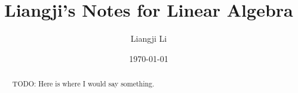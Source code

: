 \documentclass{article}
\title{Liangji's Notes for Linear Algebra}
\author{Liangji Li}
\date{\today}
\begin{document}
\maketitle
\begin{abstract}
    TODO: Here is where I would say something.
\end{abstract}
\tableofcontents
\newpage














\end{document}
